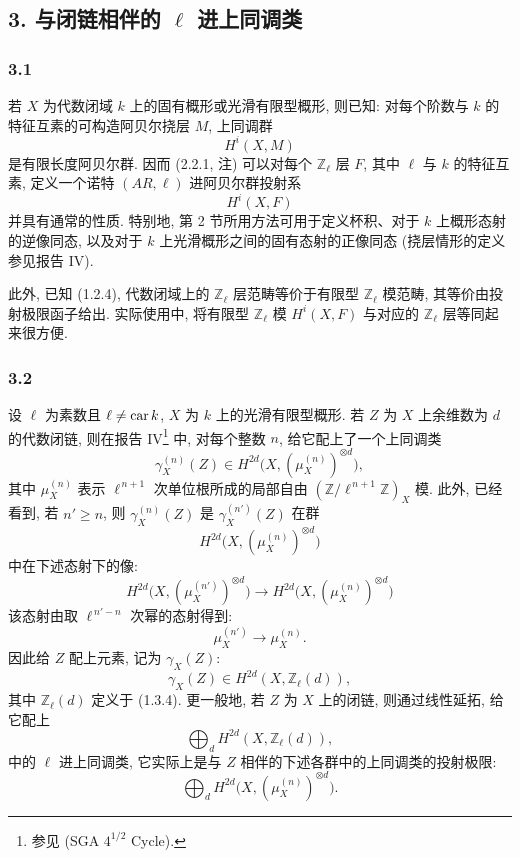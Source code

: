 \subsection*{3. 与闭链相伴的 \(\ell\) 进上同调类}

\subsubsection*{3.1}
若 \(X\) 为代数闭域 \(k\) 上的固有概形或光滑有限型概形, 则已知: 对每个阶数与 \(k\) 的特征互素的可构造阿贝尔挠层 \(M\), 上同调群
\[
H^i(X,M)
\]
是有限长度阿贝尔群. 因而 (2.2.1, 注) 可以对每个 \(\mathbb Z_\ell\) 层 \(F\), 其中 \(\ell\) 与 \(k\) 的特征互素, 定义一个诺特 \((AR,\ell)\) 进阿贝尔群投射系
\[
H^i(X,F)
\]
并具有通常的性质. 特别地, 第 2 节所用方法可用于定义杯积、对于 \(k\) 上概形态射的逆像同态, 以及对于 \(k\) 上光滑概形之间的固有态射的正像同态 (挠层情形的定义参见报告 IV).

此外, 已知 (1.2.4), 代数闭域上的 \(\mathbb Z_\ell\) 层范畴等价于有限型 \(\mathbb Z_\ell\) 模范畴, 其等价由投射极限函子给出. 实际使用中, 将有限型 \(\mathbb Z_\ell\) 模 \(H^i(X,F)\) 与对应的 \(\mathbb Z_\ell\) 层等同起来很方便.

\subsubsection*{3.2}
设 \(\ell\) 为素数且 \(\ell\ne\operatorname{car} k\), \(X\) 为 \(k\) 上的光滑有限型概形. 若 \(Z\) 为 \(X\) 上余维数为 \(d\) 的代数闭链, 则在报告 IV\footnote{参见 (SGA \(4^{1/2}\) Cycle).} 中, 对每个整数 \(n\), 给它配上了一个上同调类
\[
\gamma_X^{(n)}(Z)\in H^{2d}\bigl(X,(\mu_X^{(n)})^{\otimes d}\bigr),
\]
其中 \(\mu_X^{(n)}\) 表示 \(\ell^{\,n+1}\) 次单位根所成的局部自由 \((\mathbb Z/\ell^{\,n+1}\mathbb Z)_X\) 模. 此外, 已经看到, 若 \(n'\ge n\), 则 \(\gamma_X^{(n)}(Z)\) 是 \(\gamma_X^{(n')}(Z)\) 在群
\[
H^{2d}\bigl(X,(\mu_X^{(n)})^{\otimes d}\bigr)
\]
中在下述态射下的像:
\[
H^{2d}\bigl(X,(\mu_X^{(n')})^{\otimes d}\bigr)
\longrightarrow
H^{2d}\bigl(X,(\mu_X^{(n)})^{\otimes d}\bigr)
\]
该态射由取 \(\ell^{\,n'-n}\) 次幂的态射得到:
\[
\mu_X^{(n')}\longrightarrow \mu_X^{(n)}.
\]
因此给 \(Z\) 配上元素, 记为 \(\gamma_X(Z)\):
\[
\gamma_X(Z)\in H^{2d}(X,\mathbb Z_\ell(d)),
\]
其中 \(\mathbb Z_\ell(d)\) 定义于 (1.3.4). 更一般地, 若 \(Z\) 为 \(X\) 上的闭链, 则通过线性延拓, 给它配上
\[
\bigoplus_d H^{2d}(X,\mathbb Z_\ell(d)),
\]
中的 \(\ell\) 进上同调类, 它实际上是与 \(Z\) 相伴的下述各群中的上同调类的投射极限:
\[
\bigoplus_d H^{2d}\bigl(X,(\mu_X^{(n)})^{\otimes d}\bigr).
\]

